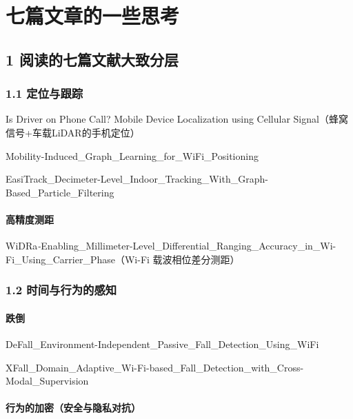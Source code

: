 \documentclass[
]{article}
\author{}
\date{}
\begin{document}
\section{七篇文章的一些思考}\label{ux4e03ux7bc7ux6587ux7ae0ux7684ux4e00ux4e9bux601dux8003}

\subsection{1
阅读的七篇文献大致分层}\label{1-ux9605ux8bfbux7684ux4e03ux7bc7ux6587ux732eux5927ux81f4ux5206ux5c42}

\subsubsection{1.1 定位与跟踪}\label{11-ux5b9aux4f4dux4e0eux8ddfux8e2a}

Is Driver on Phone Call? Mobile Device Localization using Cellular
Signal（蜂窝信号+车载LiDAR的手机定位）

Mobility-Induced\_Graph\_Learning\_for\_WiFi\_Positioning

EasiTrack\_Decimeter-Level\_Indoor\_Tracking\_With\_Graph-Based\_Particle\_Filtering

\paragraph{高精度测距}\label{ux9ad8ux7cbeux5ea6ux6d4bux8ddd}

WiDRa\emph{-}Enabling\_Millimeter-Level\_Differential\_Ranging\_Accuracy\_in\_Wi-Fi\_Using\_Carrier\_Phase（Wi-Fi
载波相位差分测距）

\subsubsection{1.2
时间与行为的感知}\label{12-ux65f6ux95f4ux4e0eux884cux4e3aux7684ux611fux77e5}

\paragraph{跌倒}\label{ux8dccux5012}

DeFall\_Environment-Independent\_Passive\_Fall\_Detection\_Using\_WiFi

XFall\_Domain\_Adaptive\_Wi-Fi-based\_Fall\_Detection\_with\_Cross-Modal\_Supervision

\paragraph{行为的加密（安全与隐私对抗）}\label{ux884cux4e3aux7684ux52a0ux5bc6ux5b89ux5168ux4e0eux9690ux79c1ux5bf9ux6297}
\end{document}
